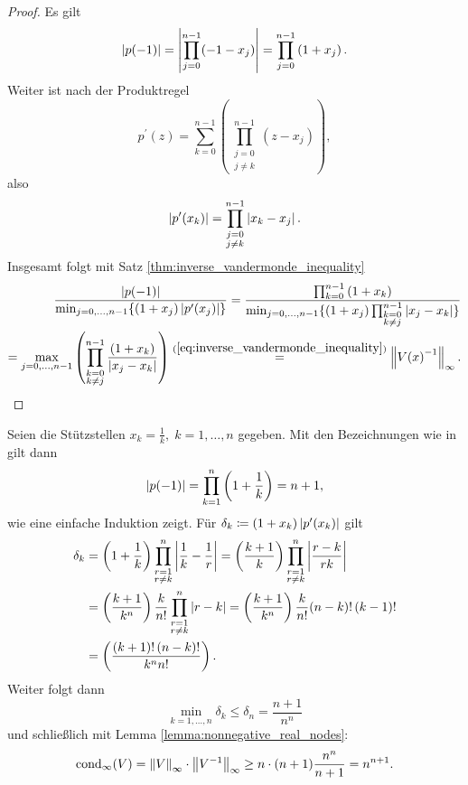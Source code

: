 \begin{proof}
    Es gilt
    \[
        \abs{p(-1)} = \abs{\prod_{j=0}^{n-1} (-1 - x_j)} = \prod_{j=0}^{n-1} \left( 1 + x_j \right).
    \]
    Weiter ist nach der Produktregel
    \[
        p^{\prime}(z) = \sum_{k=0}^{n-1} \left( \prod_{\substack{j=0\\ j\neq k}}^{n-1} \left( z - x_j \right) \right),
    \]
    also
    \[
        \abs{p^{\prime}(x_k)} = \prod_{\substack{j=0\\ j\neq k}}^{n-1} \abs{ x_k - x_j }.
    \]
    Insgesamt folgt mit Satz \ref{thm:inverse_vandermonde_inequality}
    \[
        \begin{split}
            \frac{ \abs{p(-1)}}{\min_{j=0, \dots, n-1} \{ (1+x_j) \abs{p^{\prime}(x_j)} \}}
            = \frac{\prod_{k=0}^{n-1} \left( 1 + x_k \right)}{\min_{j=0, \dots, n-1} \{ (1+x_j) \prod_{\substack{k=0\\ k\neq j}}^{n-1} \abs{ x_j - x_k }\}}\\
            = \max_{j=0, \dots, n-1} \left( \prod_{\substack{k=0\\ k \neq j}}^{n-1} \frac{\left( 1 + x_k \right)}{\abs{ x_j - x_k }} \right)
            \overset{(\ref{eq:inverse_vandermonde_inequality})}{=} \norm{\Vand{x}^{-1}}_{\infty}.
        \end{split}
    \]
\end{proof}

\begin{example}
    Seien die Stützstellen $x_k = \frac{1}{k}, \; k=1, \dots, n$ gegeben.
    Mit den Bezeichnungen wie in  gilt dann
    \[
        \abs{p(-1)} = \prod_{k=1}^{n} \left( 1 + \frac{1}{k} \right) = n+1,
    \]
    wie eine einfache Induktion zeigt.
    Für $\delta_k \defeq (1 + x_k) \abs{ p^{\prime}(x_k) }$ gilt
    \[
        \begin{split}
            \delta_k &= \left( 1 + \frac{1}{k} \right) \prod_{\substack{r = 1\\ r\neq k}}^n \abs{ \frac{1}{k} - \frac{1}{r} }
                     = \left( \frac{k+1}{k} \right) \prod_{\substack{r = 1\\ r\neq k}}^n \abs{ \frac{r-k}{rk}}\\
                     &= \left( \frac{k+1}{k^n} \right) \frac{k}{n!} \prod_{\substack{r = 1\\ r\neq k}}^n \abs{ r-k }
                     = \left( \frac{k+1}{k^n} \right) \frac{k}{n!} (n-k)! \, (k-1)!\\
                     &= \left( \frac{(k+1)! \, (n-k)!}{k^n n!} \right).
        \end{split}
    \]
    Weiter folgt dann
    \[
        \min_{k=1, \dots, n} \delta_k \leq \delta_n = \frac{n+1}{n^n}
    \]
    und schließlich mit Lemma \ref{lemma:nonnegative_real_nodes}:
    \[
        \cond[\infty]{V} = \norm{V}_\infty \cdot \norm{V^{-1}}_\infty \geq n \cdot (n+1) \frac{n^n}{n+1} = n^{n+1}.
    \]
\end{example}

